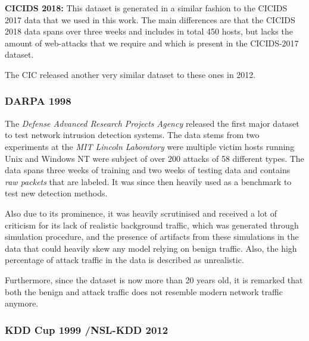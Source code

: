 \textbf{CICIDS 2018:}
This dataset is generated in a similar fashion to the CICIDS 2017 data that we used in this work. The main differences are that the CICIDS 2018 data spans over three weeks and includes in total 450 hosts, but lacks the amount of web-attacks that we require and which is present in the CICIDS-2017 dataset.

The CIC released another very similar dataset to these ones in 2012.

\subsubsection*{DARPA 1998 \cite{lippmann2000evaluating}}

The \textit{Defense Advanced Research Projects Agency} released the first major dataset to test network intrusion detection systems. The data stems from two experiments at the \textit{MIT Lincoln Laboratory} were multiple victim hosts running Unix and Windows NT were subject of over 200 attacks of 58 different types. The data spans three weeks of training and two weeks of testing data and contains \textit{raw packets} that are labeled. It was since then heavily used as a benchmark to test new detection methods. %

Also due to its prominence, it was heavily scrutinised and received a lot of criticism for its lack of realistic background traffic, which was generated through simulation procedure, and the presence of artifacts from these simulations in the data that could heavily skew any model relying on benign traffic. Also, the high percentage of attack traffic in the data is described as unrealistic.

Furthermore, since the dataset is now more than 20 years old, it is remarked that both the benign and attack traffic does not resemble modern network traffic anymore. 

\subsubsection*{KDD Cup 1999 \cite{cup1999data,cup1999dataset}/NSL-KDD 2012 \cite{tavallaee2012nsl}}


